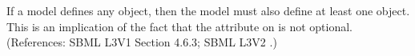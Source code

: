 If a model defines any \Species object, then the model must also define at
least one \Compartment object.  This is an implication of the fact that the
 attribute on \Species is not optional.  (References:
SBML L3V1 Section 4.6.3; SBML L3V2 .)
